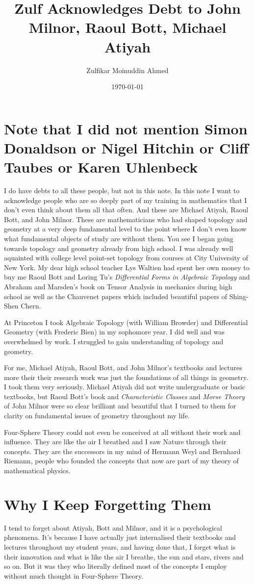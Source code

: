 \documentclass{amsart}
\title{Zulf Acknowledges Debt to John Milnor, Raoul Bott, Michael Atiyah}
\author{Zulfikar Moinuddin Ahmed}
\date{\today}
\begin{document}
\maketitle

\section{Note that I did not mention Simon Donaldson or Nigel Hitchin or Cliff Taubes or Karen Uhlenbeck}

I do have debts to all these people, but not in this note.  In this note I want to acknowledge people who are so deeply part of my training in mathematics that I don't even think about them all that often.  And these are Michael Atiyah, Raoul Bott, and John Milnor.  These are mathematicians who had shaped topology and geometry at a very deep fundamental level to the point where I don't even know what fundamental objects of study are without them.  You see I began going towards topology and geometry already from high school.  I was already well aquainted with college level point-set topology from courses at City University of New York.  My dear high school teacher Lys Waltien had spent her own money to buy me Raoul Bott and Loring Tu's {\em Differential Forms in Algebraic Topology} and Abraham and Marsden's book on Tensor Analysis in mechanics during high school as well as the Chauvenet papers which included beautiful papers of Shing-Shen Chern.

At Princeton I took Algebraic Topology (with William Browder) and Differential Geometry (with Frederic Bien) in my sophomore year.  I did well and was overwhelmed by work.  I struggled to gain understanding of topology and geometry.  

For me, Michael Atiyah, Raoul Bott, and John Milnor's textbooks and lectures more their their research work was just the foundations of all things in geometry.  I took them very seriously.  Michael Atiyah did not write undergraduate or basic textbooks, but Raoul Bott's book and {\em Characteristic Classes} and {\em Morse Theory} of John Milnor were so clear brilliant and beautiful that I turned to them for clarity on fundamental issues of geometry throughout my life.

Four-Sphere Theory could not even be conceived at all without their work and influence.  They are like the air I breathed and I saw Nature through their concepts.  They are the successors in my mind of Hermann Weyl and Bernhard Riemann, people who founded the concepts that now are part of my theory of mathematical physics.

\section{Why I Keep Forgetting Them}

I tend to forget about Atiyah, Bott and Milnor, and it is a psychological phenomena.  It's because I have actually just internalised their textbooks and lectures throughout my student years, and having done that, I forget what is their innovation and what is like the air I breathe, the sun and stars, rivers and so on.  But it was they who literally defined most of the concepts I employ without much thought in Four-Sphere Theory.
\end{document}
